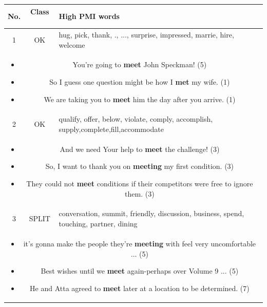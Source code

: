 \documentclass[11pt,a4paper]{article}
\begin{document}
\begin{table}[htp!]
\centering
\begin{tabularx}{\linewidth}{| c |  c| X | }
	\hline
	\textbf{No.} & \textbf{Class} \ & \textbf{High PMI words} \\ \hline \hline 
    1 & OK &  hug, pick, thank, ., ..., surprise, impressed, marrie, hire, welcome \\ \hline
    \multicolumn{3}{|p{0.92\linewidth}|}{
    \begin{itemize}[topsep=0pt,itemsep=0pt,partopsep=0pt, parsep=0pt, rightmargin=0pt]
        \item You're going to {\bf meet} John Speckman! (5)
        \item So I guess one question might be how I {\bf met}
  my wife. (1)
      \item We are taking you to {\bf meet} him the day after you arrive. (1)
    \end{itemize}
  } \\
  \hline\hline
  2  & OK & qualify, offer, below, violate, comply, accomplish, supply,complete,fill,accommodate\\ \hline
    \multicolumn{3}{|p{0.92\linewidth}|}{
    \begin{itemize}[topsep=0pt,itemsep=0pt, parsep=0pt]
        \item And we need Your help to {\bf meet} the challenge! (3)
        \item So, I want to thank you on {\bf meeting} my first condition. (3)
      \item They could not {\bf meet} conditions if their competitors were free to ignore them. (3)
    \end{itemize}
  }\\
  \hline\hline
    3 & SPLIT & conversation, summit, friendly, discussion, business, spend, touching, partner, dining \\ \hline
    \multicolumn{3}{|p{0.92\linewidth}|}{
    \begin{itemize}[topsep=0pt,itemsep=0pt, parsep=0pt]
        \item it's gonna make the people they're {\bf meeting} with feel very uncomfortable ... (5)
        \item Best wishes until we {\bf meet} again-perhaps over Volume 9 ... (5)
      \item He and Atta agreed to {\bf meet} later at a location to be determined. (7)
    \end{itemize}
  }\\
  \hline\hline

\end{tabularx}
\end{table}
\end{document}
